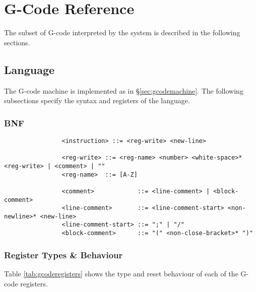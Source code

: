 \chapter{G-Code Reference}
	
	The subset of G-code interpreted by the system is described in the following
	sections.
	
	\section{Language}
		
		The G-code machine is implemented as in \S\ref{sec:gcodemachine}. The following
		subsections specify the syntax and registers of the language.
		
		\subsection{BNF}
			
			\label{sec:gcodebnf}
			
			\begin{verbatim}
				<instruction> ::= <reg-write> <new-line>
				
				<reg-write> ::= <reg-name> <number> <white-space>* <reg-write> | <comment> | ""
				<reg-name>  ::= [A-Z]
				
				<comment>            ::= <line-comment> | <block-comment>
				<line-comment>       ::= <line-comment-start> <non-newline>* <new-line> 
				<line-comment-start> ::= ";" | "/"
				<block-comment>      ::= "(" <non-close-bracket>* ")"
			\end{verbatim}
		
		\subsection{Register Types \& Behaviour}
			
			Table \ref{tab:gcoderegisters} shows the type and reset behaviour of each
			of the G-code registers.
			
